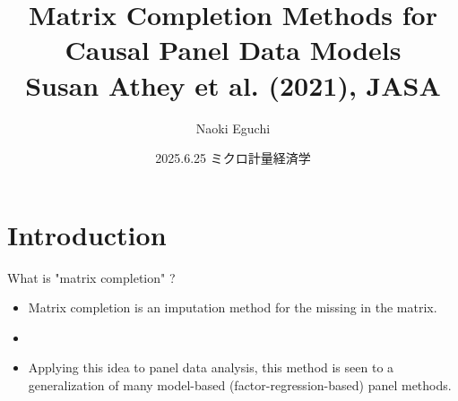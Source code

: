 \documentclass[xcolor=svgnames,aspectratio=169]{beamer}
\begin{document}
 

\title{Matrix Completion Methods for Causal Panel Data Models \\ \small{Susan Athey et al. (2021), JASA}}
\author{Naoki Eguchi}          
\date{2025.6.25 ミクロ計量経済学}

\begin{frame}                  
    \titlepage                     
\end{frame}

\section{Introduction}

\begin{frame}{What is "matrix completion" ?}
    \begin{itemize}
        \item Matrix completion is an imputation method for the missing in the matrix.
        \item 
        \item Applying this idea to panel data analysis, this method is seen to a generalization of many model-based (factor-regression-based) panel methods.
    \end{itemize}
\end{frame}
\end{document}
